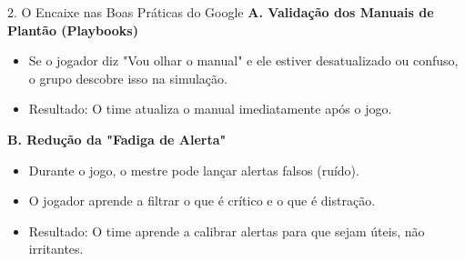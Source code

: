 \documentclass[aspectratio=169]{beamer}
\begin{document}
\begin{frame}{2. O Encaixe nas Boas Práticas do Google}
\textbf{A. Validação dos Manuais de Plantão (Playbooks)}
\begin{itemize}
    \item Se o jogador diz "Vou olhar o manual" e ele estiver desatualizado ou confuso, o grupo descobre isso na simulação.
    \item Resultado: O time atualiza o manual imediatamente após o jogo.
\end{itemize}

\vspace{0.3cm}
\textbf{B. Redução da "Fadiga de Alerta"}
\begin{itemize}
    \item Durante o jogo, o mestre pode lançar alertas falsos (ruído).
    \item O jogador aprende a filtrar o que é crítico e o que é distração.
    \item Resultado: O time aprende a calibrar alertas para que sejam úteis, não irritantes.
\end{itemize}
\end{frame}
\end{document}

